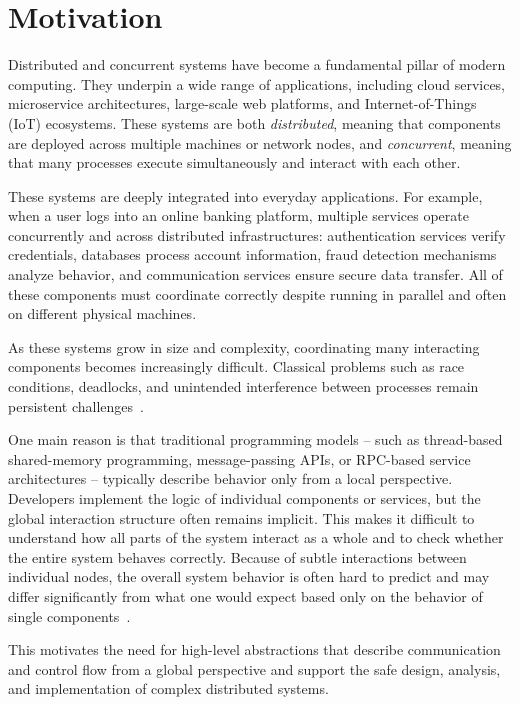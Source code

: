 \section{Motivation}
Distributed and concurrent systems have become a fundamental pillar of modern computing. They underpin a wide range of applications, including cloud services, microservice architectures, large-scale web platforms, and Internet-of-Things (IoT) ecosystems. These systems are both \emph{distributed}, meaning that components are deployed across multiple machines or network nodes, and \emph{concurrent}, meaning that many processes execute simultaneously and interact with each other. 

These systems are deeply integrated into everyday applications. For example, when a user logs into an online banking platform, multiple services operate concurrently and across distributed infrastructures: authentication services verify credentials, databases process account information, fraud detection mechanisms analyze behavior, and communication services ensure secure data transfer. All of these components must coordinate correctly despite running in parallel and often on different physical machines. 

As these systems grow in size and complexity, coordinating many interacting components becomes increasingly difficult. Classical problems such as race conditions, deadlocks, and unintended interference between processes remain persistent challenges~\cite{Survey2018}. 

One main reason is that traditional programming models -- such as thread-based shared-memory programming, message-passing APIs, or RPC-based service architectures -- typically describe behavior only from a local perspective. Developers implement the logic of individual components or services, but the global interaction structure often remains implicit. This makes it difficult to understand how all parts of the system interact as a whole and to check whether the entire system behaves correctly. Because of subtle interactions between individual nodes, the overall system behavior is often hard to predict and may differ significantly from what one would expect based only on the behavior of single components~\cite{CarboneVeschetti}.

This motivates the need for high-level abstractions that describe communication and control flow from a global perspective and support the safe design, analysis, and implementation of complex distributed systems.

